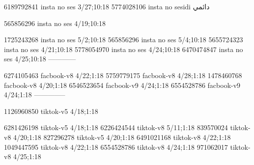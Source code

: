 
6189792841 insta no ses
3/27;10:18
5774028106 insta no sesidi
دائمي

565856296 insta no ses
4/19;10:18

1725243268 insta no ses
5/2;10:18
565856296 insta no ses
5/4;10:18
5655724323 insta no ses
4/21;10:18
5778054970 insta no ses
4/24;10:18
6470474847 insta no ses
4/25;10:18
------------

6274105463 facbook-v8
4/22;1:18
5759779175 facbook-v8
4/28;1:18
1478460768 facbook-v8
4/20;1:18
6546523654 facbook-v9
4/24;1:18
6554528786 facbook-v9
4/24;1:18
--------------

1126960850 tiktok-v5
4/18;1:18

6281426198 tiktok-v5
4/18;1:18
6226424544 tiktok-v8
5/11;1:18
839570024 tiktok-v8
4/20;1:18
827296278 tiktok-v5
4/20;1:18
6491021168 tiktok-v8
4/22;1:18
1049447595 tiktok-v8
4/22;1:18
6554528786 tiktok-v8
4/24;1:18
971062017 tiktok-v8
4/25;1:18
